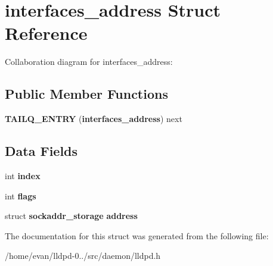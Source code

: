 \section{interfaces\-\_\-address \-Struct \-Reference}
\label{structinterfaces__address}


\-Collaboration diagram for interfaces\-\_\-address\-:
\subsection*{\-Public \-Member \-Functions}
\begin{DoxyCompactItemize}
\item 
{\bfseries \-T\-A\-I\-L\-Q\-\_\-\-E\-N\-T\-R\-Y} ({\bf interfaces\-\_\-address}) next\label{structinterfaces__address_ad096c73e4c0b953724b9b1e7cc746cdc}

\end{DoxyCompactItemize}
\subsection*{\-Data \-Fields}
\begin{DoxyCompactItemize}
\item 
int {\bfseries index}\label{structinterfaces__address_a750b5d744c39a06bfb13e6eb010e35d0}

\item 
int {\bfseries flags}\label{structinterfaces__address_ac8bf36fe0577cba66bccda3a6f7e80a4}

\item 
struct {\bf sockaddr\-\_\-storage} {\bfseries address}\label{structinterfaces__address_aae8fde91ce26bf141fe1d113e5c895fb}

\end{DoxyCompactItemize}


\-The documentation for this struct was generated from the following file\-:\begin{DoxyCompactItemize}
\item 
/home/evan/lldpd-\/0../src/daemon/lldpd.\-h\end{DoxyCompactItemize}
